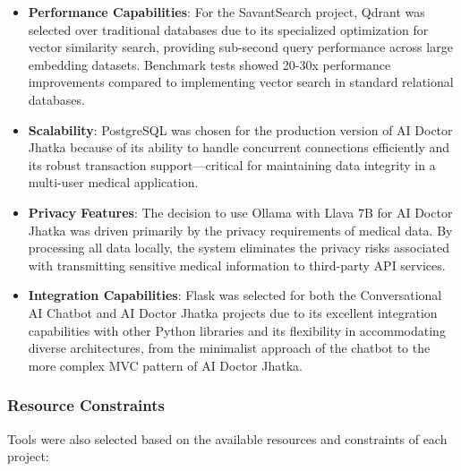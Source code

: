 \documentclass[12pt,a4paper]{article}
\begin{document}
\begin{itemize}
    \item \textbf{Performance Capabilities}: For the SavantSearch project, Qdrant was selected over traditional databases due to its specialized optimization for vector similarity search, providing sub-second query performance across large embedding datasets. Benchmark tests showed 20-30x performance improvements compared to implementing vector search in standard relational databases.
    
    \item \textbf{Scalability}: PostgreSQL was chosen for the production version of AI Doctor Jhatka because of its ability to handle concurrent connections efficiently and its robust transaction support—critical for maintaining data integrity in a multi-user medical application.
    
    \item \textbf{Privacy Features}: The decision to use Ollama with Llava 7B for AI Doctor Jhatka was driven primarily by the privacy requirements of medical data. By processing all data locally, the system eliminates the privacy risks associated with transmitting sensitive medical information to third-party API services.
    
    \item \textbf{Integration Capabilities}: Flask was selected for both the Conversational AI Chatbot and AI Doctor Jhatka projects due to its excellent integration capabilities with other Python libraries and its flexibility in accommodating diverse architectures, from the minimalist approach of the chatbot to the more complex MVC pattern of AI Doctor Jhatka.
\end{itemize}

\subsubsection{Resource Constraints}
Tools were also selected based on the available resources and constraints of each project:
\end{document}
